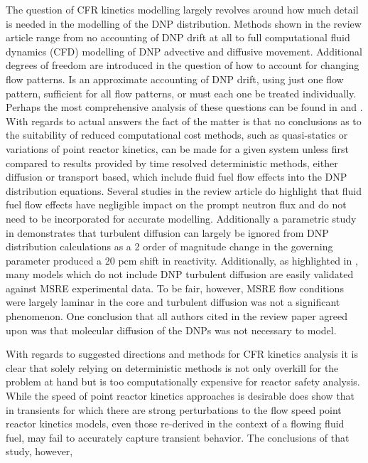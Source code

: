 \documentclass[11pt,letterpaper,twoside,english,final]{article}
\begin{document}
{The question of CFR kinetics modelling largely revolves around how much
detail is needed in the modelling of the DNP distribution. Methods shown in
the review article range from no accounting of DNP drift at all to full
computational fluid dynamics (CFD) modelling of DNP advective and diffusive movement. Additional degrees
of freedom are introduced in the question of how to account for changing
flow patterns. Is an approximate accounting of DNP drift, using just one
flow pattern, sufficient for all flow patterns, or must each one be treated
individually. Perhaps the most comprehensive analysis of these questions can be
found in \cite{dulla_models_2005} and \cite{dulla_interactions_2007}. With
regards to actual answers the fact of the matter is that no conclusions as to
the suitability of reduced computational cost methods, such as quasi-statics or
variations of point reactor kinetics, can be made for a given system unless
first compared to results provided by time resolved deterministic methods,
either diffusion or transport based, which
include fluid fuel flow effects into the DNP distribution equations. Several
studies in the review article do highlight that fluid fuel flow effects have
negligible impact on the prompt neutron flux and do not need to be incorporated
for accurate modelling. Additionally a parametric study in
\cite{aufiero_development_2014} demonstrates that turbulent diffusion can
largely be ignored from DNP distribution calculations as a 2 order of magnitude
change in the governing parameter produced a 20 pcm shift in reactivity. 
Additionally, as highlighted in \cite{delpech_benchmark_2003}, many models
which do not include DNP turbulent diffusion are easily validated against
MSRE experimental data. To be fair, however, MSRE flow conditions were largely
laminar in the core and turbulent diffusion was not a significant phenomenon.
One conclusion that all authors cited in the review paper agreed upon was that
molecular diffusion of the DNPs was not necessary to model.
\par With regards to suggested directions and methods for CFR kinetics analysis
it is clear that solely relying on deterministic methods is not only overkill
for the problem at hand but is too computationally expensive for reactor
safety analysis. While the speed of point reactor kinetics approaches is
desirable \cite{dulla_models_2005} does show that in transients for which there
are strong perturbations to the flow speed point reactor kinetics models,
even those re-derived in the context of a flowing fluid fuel, may fail to 
accurately capture transient behavior. The conclusions of that study, however,
}
\end{document}
